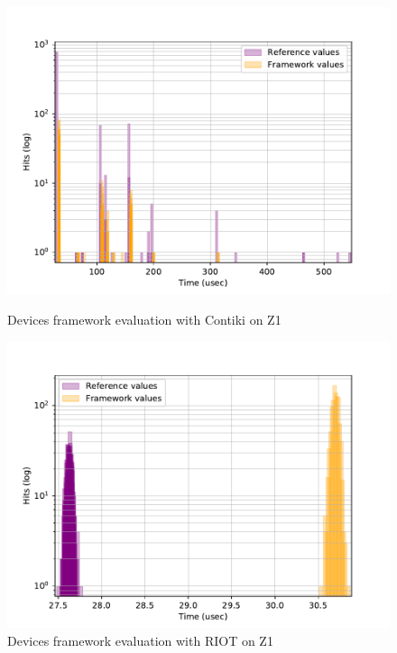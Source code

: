 \begin{figure}[!ht]
  \begin{minipage}{.45\textwidth}
      \centering
      \includegraphics[scale=.4]{assets/comparison-devices-framework-contiki-z1.pdf}
      \caption{Devices framework evaluation with Contiki on Z1\label{fig:comparison-devices-framework-contiki-z1}}
  \end{minipage}\hfill
  \begin{minipage}{.45\textwidth}        
      \centering
      \includegraphics[scale=.4]{assets/comparison-devices-framework-riot-z1.pdf}
      \caption{Devices framework evaluation with RIOT on Z1\label{fig:comparison-devices-framework-riot-z1}}
  \end{minipage}
\end{figure}